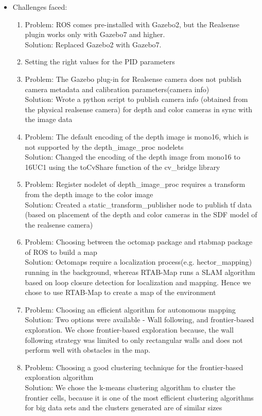 \documentclass[a4paper,12pt,oneside]{book}
\begin{document}
\begin{itemize}
	\item Challenges faced:
		\begin{enumerate}
			\item Problem: ROS comes pre-installed with Gazebo2, but the Realsense plugin works only with Gazebo7 and higher. \\
			Solution: Replaced Gazebo2 with Gazebo7.
			\item Setting the right values for the PID parameters
			\item Problem: The Gazebo plug-in for Realsense camera does not publish camera metadata and calibration parameters(camera info) \\
			Solution: Wrote a python script to publish camera info (obtained from the physical realsense camera) for depth and color cameras in sync with the image data
			\item Problem: The default encoding of the depth image is mono16, which is not supported by the depth\_image\_proc nodelets \\
			Solution: Changed the encoding of the depth image from mono16 to 16UC1 using the toCvShare function of the cv\_bridge library
			\item Problem: Register nodelet of depth\_image\_proc requires a transform from the depth image to the color image \\
			Solution: Created a static\_transform\_publisher node to publish tf data (based on placement of the depth and color cameras in the SDF model of the realsense camera)
			\item Problem: Choosing between the octomap package and rtabmap package of ROS to build a map \\
			Solution: Octomaps require a localization process(e.g. hector\_mapping) running in the background, whereas RTAB-Map runs a SLAM algorithm based on loop closure detection for localization and mapping. Hence we chose to use RTAB-Map to create a map of the environment
			\item Problem: Choosing an efficient algorithm for autonomous mapping \\
			Solution: Two options were available - Wall following, and frontier-based exploration. We chose frontier-based exploration because, the wall following strategy was limited to only rectangular walls and does not perform well with obstacles in the map.
			\item Problem: Choosing a good clustering technique for the frontier-based exploration algorithm \\
			Solution: We chose the k-means clustering algorithm to cluster the frontier cells, because it is one of the most efficient clustering algorithms for big data sets and the clusters generated are of similar sizes

\end{enumerate}
\end{itemize}
\end{document}
